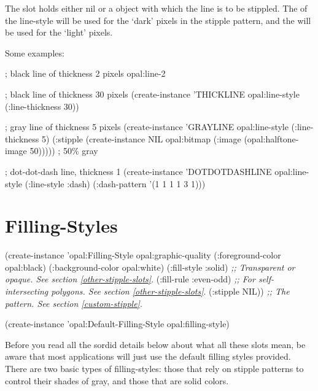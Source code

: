 The  slot holds either {\sc nil} or a 
object with which the line is to be stippled.  The
 of the line-style will be used for the `dark'
pixels in the stipple pattern, and the  will be
used for the `light' pixels.

\vspace{1 line}
\begin{group}
Some examples:
\begin{programexample}
; black line of thickness 2 pixels
opal:line-2

; black line of thickness 30 pixels
(create-instance 'THICKLINE opal:line-style (:line-thickness 30))

; gray line of thickness 5 pixels
(create-instance 'GRAYLINE opal:line-style
  (:line-thickness 5)
  (:stipple (create-instance NIL opal:bitmap
              (:image (opal:halftone-image 50))))) ; 50\% gray

; dot-dot-dash line, thickness 1
(create-instance 'DOTDOTDASHLINE opal:line-style
  (:line-style :dash)
  (:dash-pattern '(1 1 1 1 3 1)))
\end{programexample}
\end{group}




\section{Filling-Styles}

\vspace{.5 line}
\begin{programexample}
(create-instance 'opal:Filling-Style opal:graphic-quality
  (:foreground-color opal:black)
  (:background-color opal:white)
  (:fill-style :solid)    {\it ;; Transparent or opaque.  See section \ref{other-stipple-slots}}.
  (:fill-rule :even-odd)  {\it ;; For self-intersecting polygons.  See section \ref{other-stipple-slots}}.
  (:stipple NIL))         {\it ;; The pattern.  See section \ref{custom-stipple}}.

(create-instance 'opal:Default-Filling-Style opal:filling-style)
\end{programexample}

Before you read all the sordid details below about what all these slots
mean, be aware that most applications will just use the default filling styles
provided.  There are two basic types of filling-styles: those that rely on
stipple patterns to control their shades of gray, and those that are solid
colors.


